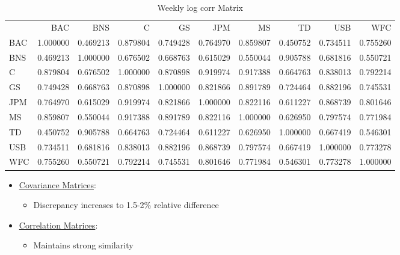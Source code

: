 \documentclass{article}
\begin{document}
\begin{table}
\caption{Weekly log corr Matrix}
\label{tab:weekly_log_corr}
\begin{tabular}{lrrrrrrrrr}
 & BAC & BNS & C & GS & JPM & MS & TD & USB & WFC \\
BAC & 1.000000 & 0.469213 & 0.879804 & 0.749428 & 0.764970 & 0.859807 & 0.450752 & 0.734511 & 0.755260 \\
BNS & 0.469213 & 1.000000 & 0.676502 & 0.668763 & 0.615029 & 0.550044 & 0.905788 & 0.681816 & 0.550721 \\
C & 0.879804 & 0.676502 & 1.000000 & 0.870898 & 0.919974 & 0.917388 & 0.664763 & 0.838013 & 0.792214 \\
GS & 0.749428 & 0.668763 & 0.870898 & 1.000000 & 0.821866 & 0.891789 & 0.724464 & 0.882196 & 0.745531 \\
JPM & 0.764970 & 0.615029 & 0.919974 & 0.821866 & 1.000000 & 0.822116 & 0.611227 & 0.868739 & 0.801646 \\
MS & 0.859807 & 0.550044 & 0.917388 & 0.891789 & 0.822116 & 1.000000 & 0.626950 & 0.797574 & 0.771984 \\
TD & 0.450752 & 0.905788 & 0.664763 & 0.724464 & 0.611227 & 0.626950 & 1.000000 & 0.667419 & 0.546301 \\
USB & 0.734511 & 0.681816 & 0.838013 & 0.882196 & 0.868739 & 0.797574 & 0.667419 & 1.000000 & 0.773278 \\
WFC & 0.755260 & 0.550721 & 0.792214 & 0.745531 & 0.801646 & 0.771984 & 0.546301 & 0.773278 & 1.000000 \\
\end{tabular}
\end{table}

\begin{itemize}
    \item \underline{Covariance Matrices}:
    \begin{itemize}
        \item Discrepancy increases to 1.5-2\% relative difference
    \end{itemize}
    \item \underline{Correlation Matrices}:
    \begin{itemize}
        \item Maintains strong similarity
    \end{itemize}
\end{itemize}
    
\end{document}
